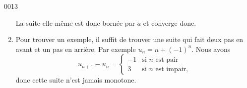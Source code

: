 \begin{corrige}{0013}
\begin{enumerate}
La suite elle-même est donc bornée par $a$ et converge donc.

\item Pour trouver un exemple, il suffit de trouver une suite qui fait deux pas en avant et un pas en arrière. Par exemple $u_n=n+(-1)^n$. Nous avons
\begin{equation}
	u_{n+1}-u_n=
\begin{cases}
	-1	&	\text{si $n$ est pair}\\
	3	&	 \text{si $n$ est impair},
\end{cases}
\end{equation}
donc cette suite n'est jamais monotone.
\end{enumerate}

\end{corrige}
